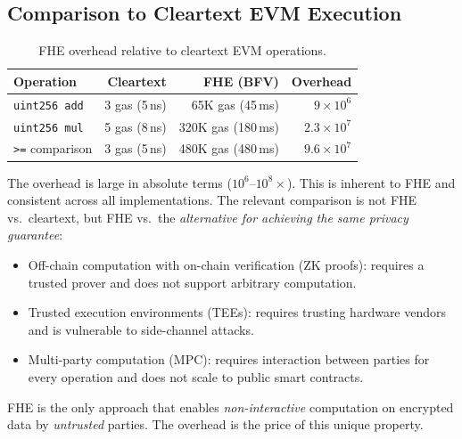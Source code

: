 \subsection{Comparison to Cleartext EVM Execution}

\begin{table}[ht]
\centering
\caption{FHE overhead relative to cleartext EVM operations.}
\label{tab:overhead}
\begin{tabular}{lrrr}
\toprule
\textbf{Operation} & \textbf{Cleartext} & \textbf{FHE (BFV)} & \textbf{Overhead} \\
\midrule
\texttt{uint256 add} & 3 gas (5\,ns) & 65K gas (45\,ms) & $9 \times 10^6$ \\
\texttt{uint256 mul} & 5 gas (8\,ns) & 320K gas (180\,ms) & $2.3 \times 10^7$ \\
\texttt{>=} comparison & 3 gas (5\,ns) & 480K gas (480\,ms) & $9.6 \times 10^7$ \\
\bottomrule
\end{tabular}
\end{table}

The overhead is large in absolute terms ($10^6$--$10^8\times$). This is inherent to
FHE and consistent across all implementations. The relevant comparison is not FHE
vs.\ cleartext, but FHE vs.\ the \emph{alternative for achieving the same privacy
guarantee}:

\begin{itemize}[leftmargin=2em]
  \item Off-chain computation with on-chain verification (ZK proofs): requires a
        trusted prover and does not support arbitrary computation.
  \item Trusted execution environments (TEEs): requires trusting hardware vendors
        and is vulnerable to side-channel attacks.
  \item Multi-party computation (MPC): requires interaction between parties for
        every operation and does not scale to public smart contracts.
\end{itemize}

FHE is the only approach that enables \emph{non-interactive} computation on encrypted
data by \emph{untrusted} parties. The overhead is the price of this unique property.


